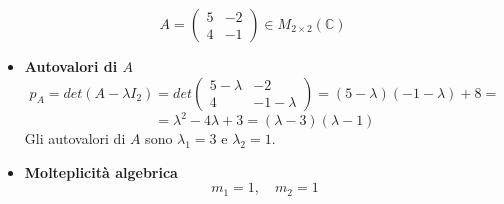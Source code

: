\documentclass[a4paper]{article}
\theoremstyle{break}
\theoremstyle{break}
\theoremstyle{break}
\theoremstyle{break}
\begin{document}
\begin{example}
  \[
  A = \begin{pmatrix} 
    5 & -2\\
    4 & -1
  \end{pmatrix} 
  \in  M_{2 \times 2}(\mathbb{C})
  \] 
  \begin{itemize}
    \item \textbf{Autovalori di \( A \)}
      \[
      p_A = det(A - \lambda I_2) = det \begin{pmatrix} 
        5 - \lambda & -2\\
        4 & -1 - \lambda
      \end{pmatrix}
      = (5 - \lambda)(-1 - \lambda) + 8 =
      \] 
      \[
      = \lambda^2 - 4\lambda + 3 = (\lambda - 3)(\lambda - 1)
      \] 
      Gli autovalori di \( A \) sono \( \lambda_1 = 3 \) e \( \lambda_2 = 1 \).

    \item \textbf{Molteplicità algebrica}
      \[
      m_1 = 1, \quad m_2 = 1
      \] 


\end{itemize}
\end{example}
\end{document}
